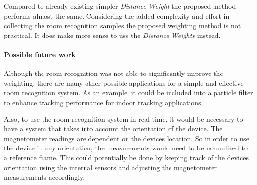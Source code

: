 Compared to already existing simpler \emph{Distance Weight} the proposed method performs almost the same. Considering the added complexity and effort in collecting the room recognition samples the proposed weighting method is not practical. It does make more sense to use the \emph{Distance Weights} instead.



\paragraph{Possible future work}

Although the room recognition was not able to significantly improve the weighting, there are many other possible applications for a simple and effective room recognition system. As an example, it could be included into a particle filter to enhance tracking performance for indoor tracking applications.

Also, to use the room recognition system in real-time, it would be necessary to have a system that takes into account the orientation of the device. The magnetometer readings are dependent on the devices location. So in order to use the device in any orientation, the measurements would need to be normalized to a reference frame. This could potentially be done by keeping track of the devices orientation using the internal sensors and adjusting the magnetometer measurements accordingly.
